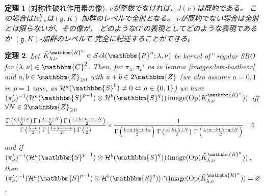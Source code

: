 \documentclass[12pt]{msjproc} %
\newcommand{\tmop}[1]{\ensuremath{\operatorname{#1}}}
\newtheorem{theorem}{定理}
\begin{document}
\begin{theorem}[対称性破れ作用素の像]
	$\nu$が整数でなければ、$J(\nu)$は既約である。
	この場合は$R_{\lambda,\nu}^X$は$(\mathfrak{g},K)$-加群のレベルで全射となる。
	$\nu$が既約でない場合は全射とは限らないが、その像が、
	どのような$G'$の表現としてどのような表現であるか $(\mathfrak{g},K)$-加群のレベルで
	完全に記述することができる。
\end{theorem}
\begin{versiona}
	
\begin{theorem}
  \label{images:prop-criterion}Let $\tilde{K}_{\lambda, \nu}^{\mathbbm{R}^n}
  \in \mathcal{S} \tmop{ol} (\mathbbm{R}^n ; \lambda, \nu)$ be kernel of''
  regular SBO for $(\lambda, \nu) \in \mathbbm{C}^2$. Then, for
  $\pi_{\lambda}, \pi_{\nu}'$ as in lemma \ref{images:lem-bastheor} and $a, b
  \in \mathbbm{Z}_{\geqslant 0}$ with $a + b \in 2\mathbbm{Z}$ (we also assume
  $a = 0, 1$ in $p = 1$ case, as $\mathcal{H}^a (\mathbbm{S}^0) \neq 0
  \Leftrightarrow a \in \{ 0, 1 \}$) we have $(\pi_{\nu}')^{- 1}
  (\mathcal{H}^a (\mathbbm{S}^{p - 1}) \otimes \mathcal{H}^b (\mathbbm{S}^q))
  \tmop{image} (\tmop{Op} (\tilde{K}_{\lambda, \nu}^{\mathbbm{R}^n}))$ iff
  $\forall N \in 2\mathbbm{Z}_{\geqslant 0}$
  \begin{eqnarray}
    & \frac{\Gamma \left( \frac{a + b + \nu}{2} \right) \Gamma \left(
    \frac{\lambda - \nu + N}{2} \right) \Gamma \left( \frac{1 + \lambda + \nu
    - n + N}{2} \right)}{\Gamma \left( \frac{\lambda - \nu}{2} \right) \Gamma
    \left( \frac{1 + \lambda - n + \nu}{2} \right) \Gamma \left( \frac{\nu}{2}
    \right)} \times \frac{1}{\Gamma \left( \frac{1 - a + b - \nu + q}{2}
    \right)  \hspace{0.17em} \Gamma \left( \frac{a + b + \lambda + N}{2}
    \right)  \hspace{0.17em} \Gamma \left( \frac{1 + a - b + \lambda - q +
    N}{2} \right)} = 0 &  \nonumber
  \end{eqnarray}
  and if $(\pi_{\nu}')^{- 1} (\mathcal{H}^a (\mathbbm{S}^{p - 1}) \otimes
  \mathcal{H}^b (\mathbbm{S}^q)) \tmop{image} (\tmop{Op} (\tilde{K}_{\lambda,
  \nu}^{\mathbbm{R}^n}))$, then $(\pi_{\nu}')^{- 1} (\mathcal{H}^a
  (\mathbbm{S}^{p - 1}) \otimes \mathcal{H}^b (\mathbbm{S}^q)) \cap
  \tmop{image} (\tmop{Op} (\tilde{K}_{\lambda, \nu}^{\mathbbm{R}^n})) =
  \varnothing$.
\end{theorem}


\end{versiona}
\end{document}
